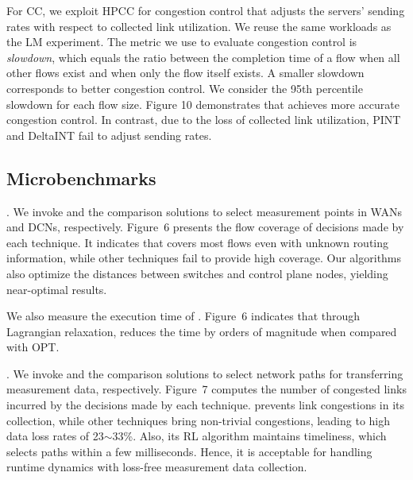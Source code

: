 For CC, we exploit HPCC \cite{li2019hpcc} for congestion control that adjusts the servers' sending rates with respect to collected link utilization. We reuse the same workloads as the LM experiment. The metric we use to evaluate congestion control is \emph{slowdown}, which equals the ratio between the completion time of a flow when all other flows exist and when only the flow itself exists. A smaller slowdown corresponds to better congestion control. We consider the 95th percentile slowdown for each flow size. Figure 10 demonstrates that \sysname achieves more accurate congestion control. In contrast, due to the loss of collected link utilization, PINT and DeltaINT fail to adjust sending rates. 

\subsection{Microbenchmarks}


. We invoke \sysname and the comparison solutions to select measurement points in WANs and DCNs, respectively. Figure~6 presents the flow coverage of decisions made by each technique. It indicates that \sysname covers most flows even with unknown routing information, while other techniques fail to provide high coverage. Our algorithms also optimize the distances between switches and control plane nodes, yielding near-optimal results. 

We also measure the execution time of \sysname. Figure~6 indicates that through Lagrangian relaxation, \sysname reduces the time by orders of magnitude when compared with OPT. 


. We invoke \sysname and the comparison solutions to select network paths for transferring measurement data, respectively. Figure~7 computes the number of congested links incurred by the decisions made by each technique. \sysname prevents link congestions in its collection, while other techniques bring non-trivial congestions, leading to high data loss rates of 23$\sim$33\%. Also, its RL algorithm maintains timeliness, which selects paths within a few milliseconds. Hence, it is acceptable for handling runtime dynamics with loss-free measurement data collection. 

